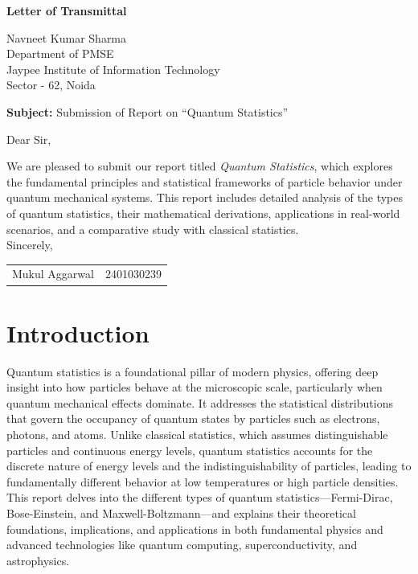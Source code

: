 \documentclass[12pt,a4paper]{article}
\begin{document}
\begin{center}
    \Large\textbf{Letter of Transmittal}
\end{center}
\vspace{1cm}

\noindent
Navneet Kumar Sharma \\
Department of PMSE \\
Jaypee Institute of Information Technology \\
Sector - 62, Noida \\

\vspace{1cm}

\noindent
\textbf{Subject:} Submission of Report on \textquotedblleft Quantum Statistics\textquotedblright \\

\vspace{1cm}

\noindent
Dear Sir, \\

\vspace{1em}

\noindent
We are pleased to submit our report titled \textit{Quantum Statistics}, which explores the fundamental principles and statistical frameworks of particle behavior under quantum mechanical systems. This report includes detailed analysis of the types of quantum statistics, their mathematical derivations, applications in real-world scenarios, and a comparative study with classical statistics.\\

\vspace{2em}
\noindent
Sincerely, \\
\vspace{1em}
\noindent
\begin{tabular}{rl}
    Mukul Aggarwal & 2401030239 \\
\end{tabular}

\newpage
\tableofcontents
\newpage


\section{Introduction}
Quantum statistics is a foundational pillar of modern physics, offering deep insight into how particles behave at the microscopic scale, particularly when quantum mechanical effects dominate. It addresses the statistical distributions that govern the occupancy of quantum states by particles such as electrons, photons, and atoms. Unlike classical statistics, which assumes distinguishable particles and continuous energy levels, quantum statistics accounts for the discrete nature of energy levels and the indistinguishability of particles, leading to fundamentally different behavior at low temperatures or high particle densities. This report delves into the different types of quantum statistics—Fermi-Dirac, Bose-Einstein, and Maxwell-Boltzmann—and explains their theoretical foundations, implications, and applications in both fundamental physics and advanced technologies like quantum computing, superconductivity, and astrophysics.
\end{document}
